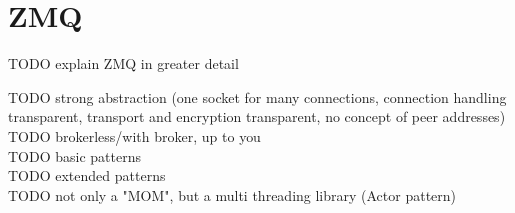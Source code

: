\chapter{ZMQ}
TODO explain ZMQ in greater detail

TODO strong abstraction (one socket for many connections, connection handling transparent, transport and encryption transparent, no concept of peer addresses)\\
TODO brokerless/with broker, up to you\\
TODO basic patterns\\
TODO extended patterns\\
TODO not only a "MOM", but a multi threading library (Actor pattern)\\
